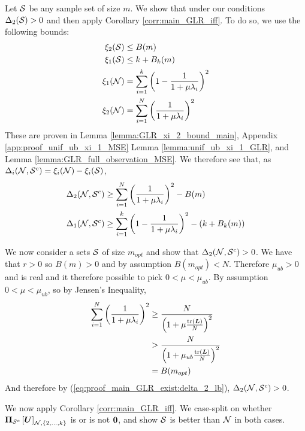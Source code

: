 Let $\mathcal{S}$ be any sample set of size $m$. We show that under our conditions $\Delta_{2}(\mathcal{S}) > 0$ and then apply Corollary \ref{corr:main_GLR_iff}. 
To do so, we use the following bounds:
\begin{align}
    \xi_{2}(\mathcal{S}) &\leq B(m) \\
    \xi_{1}(\mathcal{S}) &\leq k + B_{k}(m) \\
    \xi_{1}(\mathcal{N}) &= \sum_{i=1}^{k} \left(1 - \frac{1}{1+\mu\lambda_{i}}\right)^{2} \\
    \xi_{2}(\mathcal{N}) & = \sum_{i=1}^{N} \left( \frac{1}{1+\mu\lambda_{i}}\right)^{2}
\end{align}
These are proven in Lemma \ref{lemma:GLR_xi_2_bound_main}, Appendix \ref{app:proof_unif_ub_xi_1_MSE} Lemma \ref{lemma:unif_ub_xi_1_GLR}, and Lemma \ref{lemma:GLR_full_observation_MSE}.
We therefore see that, as $\Delta_{i}(\mathcal{N},\mathcal{S}^{c}) = \xi_{i}(\mathcal{N}) - \xi_{i}(\mathcal{S})$,
\begin{align}
    \Delta_{2}(\mathcal{N},\mathcal{S}^{c}) &\geq \sum_{i=1}^{N} \left( \frac{1}{1+\mu\lambda_{i}}\right)^{2} - B(m) \label{eq:proof_main_GLR_exist:delta_2_lb} \\
    \Delta_{1}(\mathcal{N},\mathcal{S}^{c}) &\geq \sum_{i=1}^{k} \left(1 - \frac{1}{1+\mu\lambda_{i}}\right)^{2} - (k + B_{k}(m)) \label{eq:proof_main_GLR_exist:delta_1_lb}
\end{align}

We now consider a sets $\mathcal{S}$ of size $m_{opt}$ and show that $\Delta_{2}(\mathcal{N},\mathcal{S}^{c}) > 0$. We have that $r > 0$ so $B(m) > 0$ and by assumption $B(m_{opt}) < N$. Therefore $\mu_{ub} > 0$ and is real and it therefore possible to pick $0 < \mu < \mu_{ub}$.
By assumption $0<\mu<\mu_{ub}$, so by Jensen's Inequality,
\begin{align}
    \sum_{i=1}^{N}\left(\frac{1}{1 + \mu\lambda_{i}}\right)^{2} &\geq \frac{N}{\left(1+\mu\frac{\textrm{tr}\left( \bm{L}
 \right)}{N}  \right)^{2}}\\
    &> \frac{N}{\left(1+\mu_{ub}\frac{\textrm{tr}\left( \bm{L}
 \right)}{N} 
  \right)^{2}}\\ 
    &= B(m_{opt})
\end{align}
And therefore by (\ref{eq:proof_main_GLR_exist:delta_2_lb}), $\Delta_{2}(\mathcal{N},\mathcal{S}^{c}) > 0$. 

We now apply Corollary \ref{corr:main_GLR_iff}. We case-split on whether $ \projgen{\set{S}^{c}}\msubgen[\set{N},\{2,\ldots,k\}]{\matr{U}}$ is or is not $\bm{0}$, and show $\mathcal{S}$ is better than $\mathcal{N}$ in both cases.
